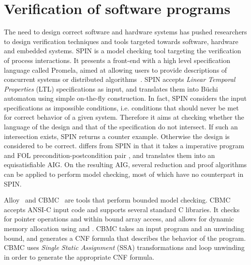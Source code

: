 

\section{Verification of software programs}
The need to design correct software and hardware systems has pushed researchers to design verification 
techniques and tools targeted towards software, hardware and embedded systems.
SPIN is a model checking tool targeting the verification of process interactions. It presents 
a front-end with a high level specification language called Promela, aimed at allowing users
to provide descriptions of concurrent systems or distributed algorithms~\cite{holzmann1997model}. 
SPIN accepts {\em Linear Temporal Properties} (LTL) specifications 
as input, and translates them into B\"uchi automaton using simple on-the-fly construction. 
In fact, SPIN considers the input specifications as impossible conditions, i.e. conditions that should 
never be met for correct behavior of a given system. Therefore it aims at checking whether the
language of the design and that of the specification do not intersect. If such an intersection 
exists, SPIN returns a counter example. Otherwise the design is considered to be correct. 
\mytool{} differs from SPIN in that it takes a imperative program \Pm and 
FOL precondition-postcondition pair \pair{\Pre}{\Post}, 
and translates them into an equisatisfiable AIG. On the resulting 
AIG, several reduction and proof algorithms can be applied to perform model checking, most
of which have no counterpart in SPIN.

Alloy~\cite{jackson2002alloy} and CBMC~\cite{clarke2004tool} are  tools 
that perform bounded model checking. CBMC accepts ANSI-C input code and supports
several standard C libraries. It checks for pointer operations and within bound array access, 
and allows for dynamic memory allocation using  and . 
CBMC takes an input program and 
an unwinding bound, and generates a CNF formula that describes the behavior of the program. CBMC 
uses {\em Single Static Assignment} (SSA) transformations and loop unwinding in order to generate the appropriate CNF formula.   

